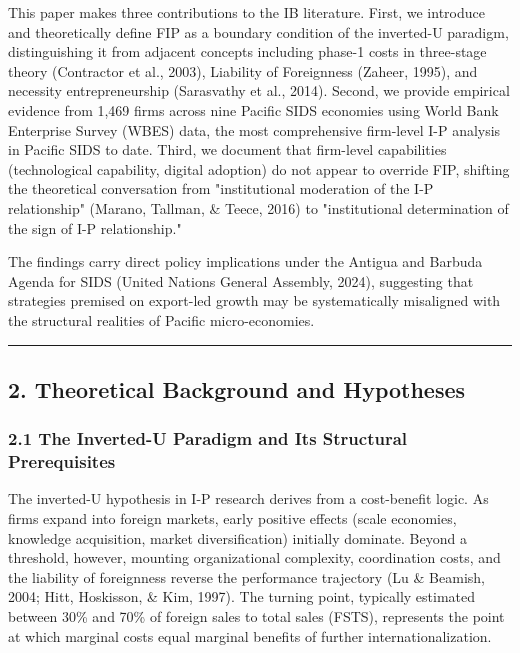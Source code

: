 \documentclass[12pt,a4paper]{article}
\begin{document}
This paper makes three contributions to the IB literature. First, we
introduce and theoretically define FIP as a boundary condition of the
inverted-U paradigm, distinguishing it from adjacent concepts including
phase-1 costs in three-stage theory (Contractor et al., 2003), Liability
of Foreignness (Zaheer, 1995), and necessity entrepreneurship
(Sarasvathy et al., 2014). Second, we provide empirical evidence from
1,469 firms across nine Pacific SIDS economies using World Bank
Enterprise Survey (WBES) data, the most comprehensive firm-level I-P
analysis in Pacific SIDS to date. Third, we document that firm-level
capabilities (technological capability, digital adoption) do not appear
to override FIP, shifting the theoretical conversation from
"institutional moderation of the I-P relationship" (Marano, Tallman, \&
Teece, 2016) to "institutional determination of the sign of I-P
relationship."

The findings carry direct policy implications under the Antigua and
Barbuda Agenda for SIDS (United Nations General Assembly, 2024),
suggesting that strategies premised on export-led growth may be
systematically misaligned with the structural realities of Pacific
micro-economies.

\begin{center}\rule{0.5\linewidth}{0.5pt}\end{center}

\hypertarget{2-theoretical-background-and-hypotheses}{%
\subsection{2. Theoretical Background and
Hypotheses}\label{2-theoretical-background-and-hypotheses}}

\hypertarget{21-the-inverted-u-paradigm-and-its-structural-prerequisites}{%
\subsubsection{2.1 The Inverted-U Paradigm and Its Structural
Prerequisites}\label{21-the-inverted-u-paradigm-and-its-structural-prerequisites}}

The inverted-U hypothesis in I-P research derives from a cost-benefit
logic. As firms expand into foreign markets, early positive effects
(scale economies, knowledge acquisition, market diversification)
initially dominate. Beyond a threshold, however, mounting organizational
complexity, coordination costs, and the liability of foreignness reverse
the performance trajectory (Lu \& Beamish, 2004; Hitt, Hoskisson, \&
Kim, 1997). The turning point, typically estimated between 30\% and 70\%
of foreign sales to total sales (FSTS), represents the point at which
marginal costs equal marginal benefits of further internationalization.
\end{document}
